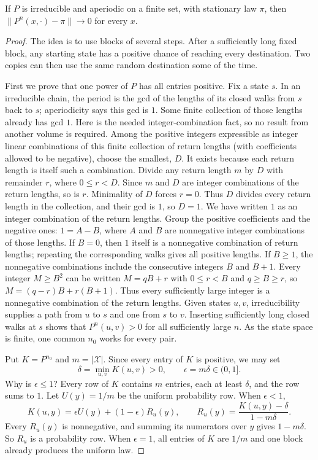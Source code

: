 \begin{theorem}[convergence]\label{thm:ergodic}
If $P$ is irreducible and aperiodic on a finite set, with stationary law $\pi$, then $\|P^n(x,\cdot)-\pi\|\to0$ for every $x$.
\end{theorem}
\begin{proof}
The idea is to use blocks of several steps. After a sufficiently long fixed block, any starting state has a positive chance of reaching every destination. Two copies can then use the same random destination some of the time.

First we prove that one power of $P$ has all entries positive. Fix a state $s$. In an irreducible chain, the period is the gcd of the lengths of its closed walks from $s$ back to $s$; aperiodicity says this gcd is $1$. Some finite collection of those lengths already has gcd $1$. Here is the needed integer-combination fact, so no result from another volume is required. Among the positive integers expressible as integer linear combinations of this finite collection of return lengths (with coefficients allowed to be negative), choose the smallest, $D$. It exists because each return length is itself such a combination. Divide any return length $m$ by $D$ with remainder $r$, where $0\le r<D$. Since $m$ and $D$ are integer combinations of the return lengths, so is $r$. Minimality of $D$ forces $r=0$. Thus $D$ divides every return length in the collection, and their gcd is $1$, so $D=1$. We have written $1$ as an integer combination of the return lengths. Group the positive coefficients and the negative ones: $1=A-B$, where $A$ and $B$ are nonnegative integer combinations of those lengths. If $B=0$, then $1$ itself is a nonnegative combination of return lengths; repeating the corresponding walks gives all positive lengths. If $B\ge1$, the nonnegative combinations include the consecutive integers $B$ and $B+1$. Every integer $M\ge B^2$ can be written $M=qB+r$ with $0\le r<B$ and $q\ge B\ge r$, so $M=(q-r)B+r(B+1)$. Thus every sufficiently large integer is a nonnegative combination of the return lengths. Given states $u,v$, irreducibility supplies a path from $u$ to $s$ and one from $s$ to $v$. Inserting sufficiently long closed walks at $s$ shows that $P^n(u,v)>0$ for all sufficiently large $n$. As the state space is finite, one common $n_0$ works for every pair.

Put $K=P^{n_0}$ and $m=|\mathcal X|$. Since every entry of $K$ is positive, we may set
\[
 \delta=\min_{u,v}K(u,v)>0,\qquad \epsilon=m\delta\in(0,1].
\]
Why is $\epsilon\le1$? Every row of $K$ contains $m$ entries, each at least $\delta$, and the row sums to $1$. Let $U(y)=1/m$ be the uniform probability row. When $\epsilon<1$,
\[
 K(u,y)=\epsilon U(y)+(1-\epsilon)R_u(y),\qquad
 R_u(y)=\frac{K(u,y)-\delta}{1-m\delta}.
\]
Every $R_u(y)$ is nonnegative, and summing its numerators over $y$ gives $1-m\delta$. So $R_u$ is a probability row. When $\epsilon=1$, all entries of $K$ are $1/m$ and one block already produces the uniform law.




\end{proof}

